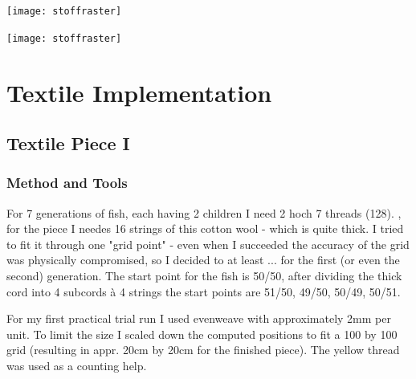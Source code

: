 \documentclass{scrartcl}
\begin{document}
\begin{minipage}[t]{0.48\textwidth}
    \texttt{[image: stoffraster]}
\end{minipage}
\hspace{0.5cm}
\begin{minipage}[t]{0.48\textwidth}
    \texttt{[image: stoffraster]}
\end{minipage}
\vspace{0.5cm}

\section{Textile Implementation}

\subsection{Textile Piece I}
\subsubsection{Method and Tools}

For 7 generations of fish, each having 2 children I need 2 hoch 7 threads (128). , for the piece I needes 16 strings of this cotton wool - which is quite thick. I tried to fit it through one "grid point" - even when I succeeded the accuracy of the grid was physically compromised, so I decided to at least ... for the first (or even the second) generation. The start point for the fish is 50/50, after dividing the thick cord into 4 subcords à 4 strings the start points are 51/50, 49/50, 50/49, 50/51.\\

\begin{minipage}[t]{0.48\textwidth}
\end{minipage}
\hspace{0.5cm}
\begin{minipage}[t]{0.48\textwidth}
    For my first practical trial run I used evenweave with approximately 2mm per unit. To limit the size I scaled down the computed positions to fit a 100 by 100 grid (resulting in appr. 20cm by 20cm for the finished piece). The yellow thread was used as a counting help.
\end{minipage}
\vspace{0.5cm}
\end{document}
